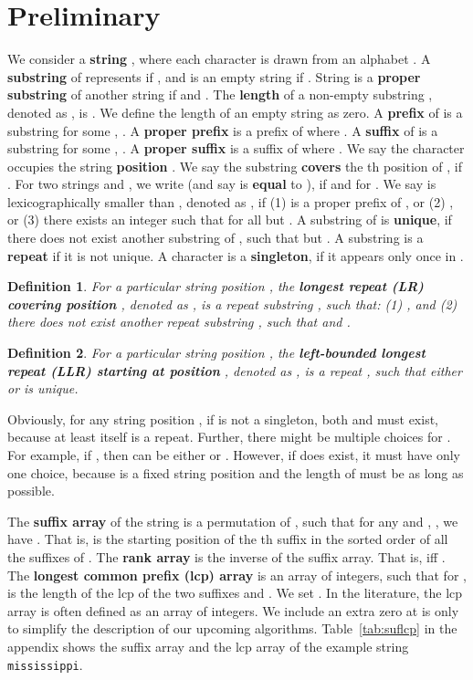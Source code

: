 \documentclass[preprint]{elsarticle}
\newtheorem{definition}{Definition}[section]
\begin{document}
\section{Preliminary}
\label{sec:prelim}
We consider a {\bf string} ,
where each character  is
drawn from an alphabet .
A {\bf substring} 
of  represents  if ,
and is an empty string if .
String  is a {\bf proper substring} of another string
 if  and . 
The {\bf length} of a non-empty substring , denoted as
, is . We define the length of an empty string
as zero. 
A {\bf prefix} of  is a substring 
for some , . 
A {\bf proper prefix}  is a prefix of  where .
A {\bf suffix} of  is a substring
 for some , .  
A {\bf proper suffix}  is a suffix of  where .
We say the character  occupies the string {\bf position} .
We say the substring  {\bf covers} the th position of
, if .  
For two strings  and , we write  (and say  is {\bf
  equal} to ), if  and  for 
.  
We say  is lexicographically smaller than ,
denoted as , if (1)  is a proper prefix of , or (2)
, or (3) there exists an integer  such that
 for all  but .
A substring
 of  is {\bf unique}, if there does not exist
another substring  of , such that 
 but . 
A substring is a {\bf repeat} if it is not unique.
A character  is a {\bf singleton}, if it appears only once in
.


\begin{definition}
\label{def:lr}
For a particular string position ,  
the {\bf longest repeat (LR) covering position} , denoted
as , is 
a repeat substring , such that: (1) , and 
(2) there does not exist  another repeat substring , such
that  and . 
\end{definition}

\begin{definition}
\label{def:llr}
For a particular string position , the
{\bf left-bounded longest repeat (LLR) starting at position },
denoted as , is a repeat ,
such that either  or  is unique. 
\end{definition}


Obviously, 
for any string position , if  is not a singleton, both
 and 
must exist, because at least  itself is a repeat. 
Further, there might be multiple choices for . For
example, if , then  can be either
 or .
However, if  does exist, it
must have only one choice, because  is a fixed string position and
the length of  must be as long as possible.




The {\bf suffix array}  of the string  is a
permutation of , such that for any  and ,
, we have .
That is,  is the starting position of the th suffix in
the sorted order of all the suffixes of .
The {\bf rank array}  is the inverse of the suffix
array. That is,  iff . 
The {\bf longest common prefix (lcp) array}  is an
array of  integers, such that for ,  is
the length of the lcp of the two suffixes  and
. We set .  In the literature,
the lcp array is often defined as an array of  integers. We include
an extra zero at  is only to simplify the description 
of our upcoming
algorithms.  
Table~\ref{tab:suflcp}
in the appendix 
shows the suffix array and the lcp
array of the example string {\tt mississippi}.
\end{document}
